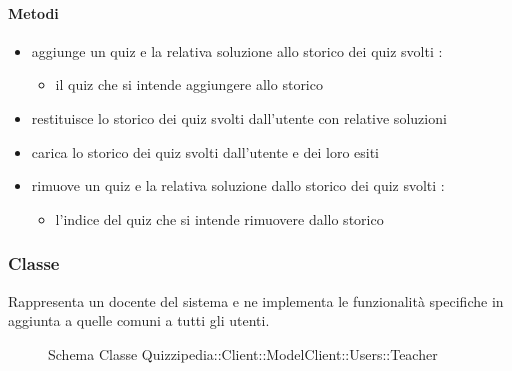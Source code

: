 \paragraph{Metodi}
\begin{itemize}
\item {}
\newline
aggiunge un quiz e la relativa soluzione allo storico dei quiz svolti
\newline
{} :
\begin{itemize}
\item {}
\newline
il quiz che si intende aggiungere allo storico
\end{itemize}
\item {}
\newline
restituisce lo storico dei quiz svolti dall'utente con relative soluzioni
\newline
\item {}
\newline
carica lo storico dei quiz svolti dall'utente e dei loro esiti
\newline
\item {}
\newline
rimuove un quiz e la relativa soluzione dallo storico dei quiz svolti
\newline
{} :
\begin{itemize}
\item {}
\newline
l'indice del quiz che si intende rimuovere dallo storico
\end{itemize}
\end{itemize}
\subsubsection{Classe }
Rappresenta un docente del sistema e ne implementa le funzionalità specifiche in aggiunta a quelle comuni a tutti gli utenti.
\begin{figure}[H]
\centering
\noindent{}
\caption[Schema Classe Teacher]{Schema Classe Quizzipedia::Client::ModelClient::Users::Teacher}
\end{figure}
